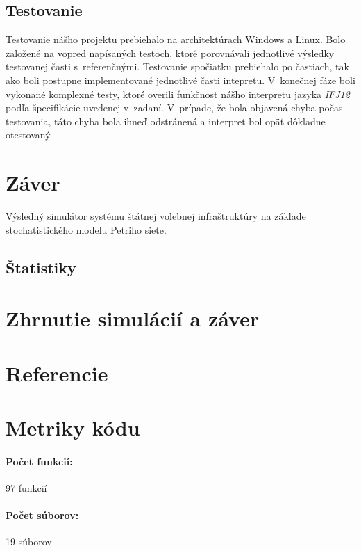 \documentclass[12pt,a4paper,titlepage,final]{article}
\begin{document}
\subsection{Testovanie}
Testovanie nášho projektu prebiehalo na architektúrach Windows a Linux. Bolo založené na vopred napísaných testoch, ktoré porovnávali jednotlivé výsledky testovanej časti s~referenčnými. Testovanie spočiatku prebiehalo po častiach, tak ako boli postupne implementované jednotlivé časti intepretu.
V~konečnej fáze boli vykonané komplexné testy, ktoré overili funkčnost nášho interpretu jazyka \emph{IFJ12} podľa špecifikácie uvedenej v~zadaní. V~prípade, že bola objavená chyba počas testovania, táto chyba bola ihneď odstránená a interpret bol opäť dôkladne otestovaný.
\newpage
\section{Záver}
Výsledný simulátor systému štátnej volebnej infraštruktúry na základe stochatistického modelu Petriho siete.

\subsection{Štatistiky}
\newpage
\section{Zhrnutie simulácií a záver}

 
\newpage




\newpage

\section{Referencie}





\newpage
\section{Metriky kódu}

\paragraph{Počet funkcií:} 97 funkcií
\paragraph{Počet súborov:} 19 súborov
\end{document}
